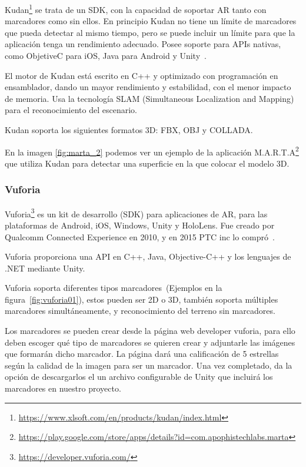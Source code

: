 Kudan\footnote{\url{https://www.xlsoft.com/en/products/kudan/index.html}} 
se trata de un SDK, con la capacidad de soportar AR tanto con marcadores como sin ellos. En principio Kudan no tiene un límite de marcadores que pueda detectar al mismo tiempo, pero se puede incluir un límite para que la aplicación tenga un rendimiento adecuado. 
Posee soporte para APIs nativas, como ObjetiveC para iOS, Java para Android y Unity~\cite{kudan_developer_hub}.

El motor de Kudan está escrito en C++ y optimizado con programación en ensamblador, dando un mayor rendimiento y estabilidad, con el menor impacto de memoria.
Usa la tecnología SLAM (Simultaneous Localization and Mapping) para el reconocimiento del escenario.

Kudan soporta los siguientes formatos 3D: FBX, OBJ y COLLADA.

En la imagen \ref{fig:marta_2} podemos ver un ejemplo de la aplicación M.A.R.T.A\footnote{\url{https://play.google.com/store/apps/details?id=com.apophistechlabs.marta}} que utiliza Kudan para detectar una superficie en la que colocar el modelo 3D.




\subsubsection{Vuforia}\label{sub:Def_Vuforia}

Vuforia\footnote{\url{https://developer.vuforia.com/}} es un kit de desarrollo (SDK) para aplicaciones de AR, para las plataformas de Android, iOS, Windows, Unity y HoloLens. Fue creado por Qualcomm Connected Experience en 2010, y en 2015 PTC inc lo compró~\cite{simonetti2013vuforia}.

Vuforia proporciona una API en C++, Java, Objective-C++ y los lenguajes de .NET mediante Unity.

Vuforia soporta diferentes tipos marcadores~(Ejemplos en la figura~\ref{fig:vuforia01}), estos pueden ser 2D o 3D, también soporta múltiples marcadores simultáneamente, y reconocimiento del terreno sin marcadores.


Los marcadores se pueden crear desde la página web developer vuforia, para ello deben escoger qué tipo de marcadores se quieren crear y adjuntarle las imágenes que formarán dicho marcador. La página dará una calificación de 5 estrellas según la calidad de la imagen para ser un marcador. Una vez completado, da la opción de descargarlos el un archivo configurable de Unity que incluirá los marcadores en nuestro proyecto.



